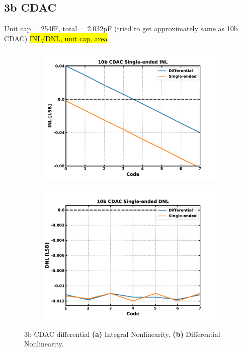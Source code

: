 \subsection{3b CDAC}
Unit cap = 254fF, total = 2.032pF (tried to get approximately same as 10b CDAC)
\hl{INL/DNL, unit cap, area}

	\begin{figure}[htb!]
	    \centering
	    \begin{subfigure}{0.5\textwidth}
	        \centering
	        \includegraphics[width=1\textwidth, angle=0]{./figs/results/cdac_3b_inl}
	        \caption{ }
	        \label{fig:cdac_3b_inl}
	    \end{subfigure}%
	    \begin{subfigure}{0.5\textwidth}
	        \centering
	        \includegraphics[width=1\textwidth, angle=0]{./figs/results/cdac_3b_dnl}
	        \caption{ }
	        \label{fig:cdac_3b_dnl}
	    \end{subfigure}
	    \label{fig:3b_cdac_nonlinearity}
	    \caption{3b CDAC differential \textbf{(a)} Integral Nonlinearity, \textbf{(b)} Differential Nonlinearity.}
	\end{figure} 



